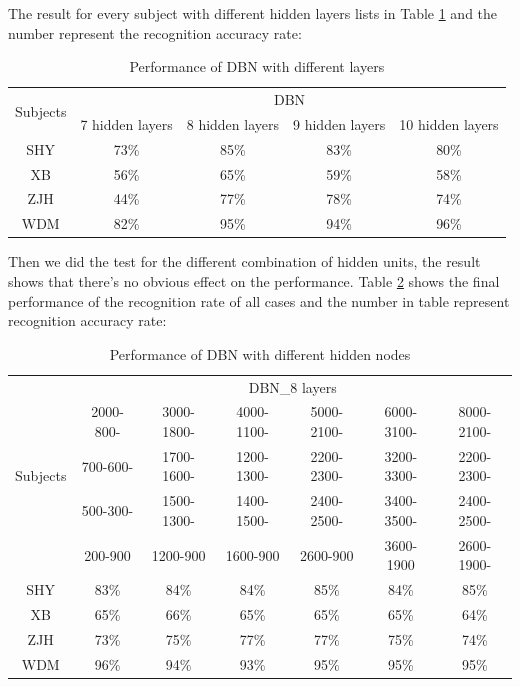 \documentclass{llncs}
\begin{document}
The result for every subject with different hidden layers lists in Table \ref{tab1} and the number represent the recognition accuracy rate:
\begin{table}
\caption{Performance of DBN with different layers}
\label{tab1}
\begin{center}
\begin{tabular}{|c|c|c|c|c|}
\hline
\multirow{2}{*}{Subjects}	& \multicolumn{4}{c|}{DBN}  \\
\cline{2-5}\rule{0pt}{12pt}
			 	& 7 hidden layers & 8 hidden layers & 9 hidden layers	&  10 hidden layers \\
\hline \rule{0pt}{12pt}
SHY				& 73\%		   & 85\%    &    83\%   &    80\% \\
XB				& 56\%		   & 65\%    &    59\%   &    58\% \\
ZJH				& 44\%	   	   & 77\%    &    78\%   &    74\% \\
WDM				& 82\%	   	   & 95\%    &    94\%   &    96\% \\[2pt]
\hline
\end{tabular}
\end{center}
\end{table}


Then we did the test for the different combination of hidden units, the result shows that there's no obvious effect on the performance. Table \ref{tab2} shows the final performance of the recognition rate of all cases and the number in table represent recognition accuracy rate:
\begin{table}
\caption{Performance of DBN with different hidden nodes}
\label{tab2}
\begin{center}
\begin{tabular}{|c|c|c|c|c|c|c|}
\hline
\multirow{5}{*}{Subjects}	& \multicolumn{6}{c|}{DBN\_8 layers}  \\
\cline{2-7}\rule{0pt}{12pt}
			 	& 2000-800- & 3000-1800- & 4000-1100-	&  5000-2100- & 6000-3100- & 8000-2100- \\
			 	& 700-600- & 1700-1600- & 1200-1300-	&  2200-2300- & 3200-3300- & 2200-2300- \\
			 	& 500-300- & 1500-1300- & 1400-1500-	&  2400-2500- & 3400-3500- & 2400-2500- \\
			 	& 200-900 & 1200-900 & 1600-900	&  2600-900 & 3600-1900 & 2600-1900- \\
\hline \rule{0pt}{12pt}
SHY				& 83\%		   & 84\%    &    84\%   &    85\% & 84\% & 85\% \\
XB				& 65\%		   & 66\%    &    65\%   &    65\% & 65\% & 64\%\\
ZJH				& 73\%	   	   & 75\%    &    77\%   &    77\% & 75\% & 74\%\\
WDM				& 96\%	   	   & 94\%    &    93\%   &    95\% & 95\% & 95\%\\[2pt]
\hline
\end{tabular}
\end{center}
\end{table}
\end{document}
